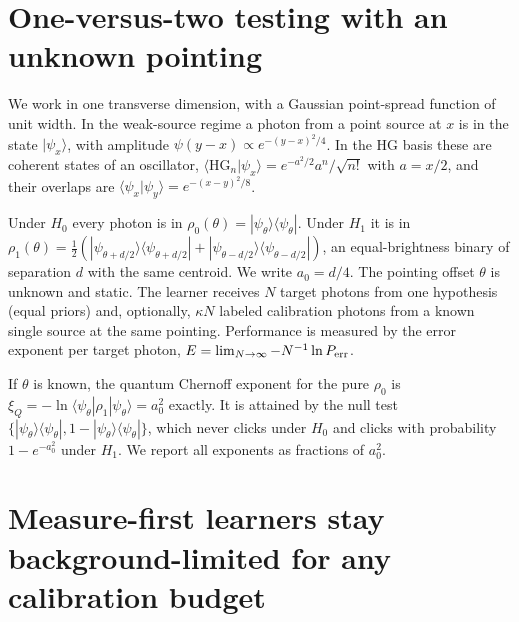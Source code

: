 \documentclass[reprint,pra,aps,amsmath,amssymb,superscriptaddress,nofootinbib]{revtex4-2}
\newcommand{\ket}[1]{|#1\rangle}
\newcommand{\bra}[1]{\langle #1|}
\begin{document}
\section{One-versus-two testing with an unknown pointing}
\label{sec:setting}

We work in one transverse dimension, with a Gaussian point-spread function of unit width. In the weak-source
regime a photon from a point source at $x$ is in the state $\ket{\psi_x}$, with amplitude
$\psi(y-x)\propto e^{-(y-x)^2/4}$. In the HG basis these are coherent states of an oscillator,
$\langle\mathrm{HG}_n|\psi_x\rangle=e^{-a^2/2}a^n/\sqrt{n!}$ with $a=x/2$, and their overlaps are
$\langle\psi_x|\psi_y\rangle=e^{-(x-y)^2/8}$.

Under $H_0$ every photon is in $\rho_0(\theta)=\ket{\psi_\theta}\bra{\psi_\theta}$. Under $H_1$ it is in
$\rho_1(\theta)=\tfrac12(\ket{\psi_{\theta+d/2}}\bra{\psi_{\theta+d/2}}+\ket{\psi_{\theta-d/2}}\bra{\psi_{\theta-d/2}})$,
an equal-brightness binary of separation $d$ with the same centroid. We write $a_0=d/4$. The pointing offset
$\theta$ is unknown and static. The learner receives $N$ target photons from one hypothesis (equal priors) and,
optionally, $\kappa N$ labeled calibration photons from a known single source at the same pointing. Performance is
measured by the error exponent per target photon, $E=\lim_{N\to\infty}-N^{-1}\ln P_{\rm err}$.

If $\theta$ is known, the quantum Chernoff exponent \cite{Audenaert2007,Nussbaum2009} for the pure $\rho_0$ is
$\xi_Q=-\ln\bra{\psi_\theta}\rho_1\ket{\psi_\theta}=a_0^2$ exactly. It is attained by the null test
$\{\ket{\psi_\theta}\bra{\psi_\theta},1-\ket{\psi_\theta}\bra{\psi_\theta}\}$, which never clicks under $H_0$ and
clicks with probability $1-e^{-a_0^2}$ under $H_1$. We report all exponents as fractions of $a_0^2$.

\section{Measure-first learners stay background-limited for any calibration budget}
\label{sec:classical}
\end{document}
